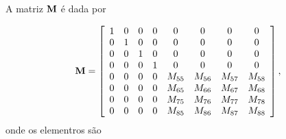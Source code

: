 \documentclass[sublist]{fei}
\begin{document}
A matriz \({\bf M}\) é dada por

\begin{equation} \label{leftMatrix}
    {\bf M} = \left[ \begin{array}{ccccccccc} 1 & 0 & 0 & 0 & 0 & 0 & 0 & 0 \\ 0 & 1 & 0 & 0 & 0 & 0 & 0 & 0 \\0 & 0 & 1 & 0 & 0 & 0 & 0 & 0 \\ 0 & 0 & 0 & 1 & 0 & 0 & 0 & 0 \\ 0 & 0 & 0 & 0 & M_{55} & M_{56} & M_{57} & M_{58} \\ 0 & 0 & 0 & 0 & M_{65} & M_{66} & M_{67} & M_{68} \\ 0 & 0 & 0 & 0 & M_{75} & M_{76} & M_{77} & M_{78} \\ 0 & 0 & 0 & 0 & M_{85} & M_{86} & M_{87} & M_{88} \end{array} \right],
\end{equation}
onde os elementros são
\end{document}
